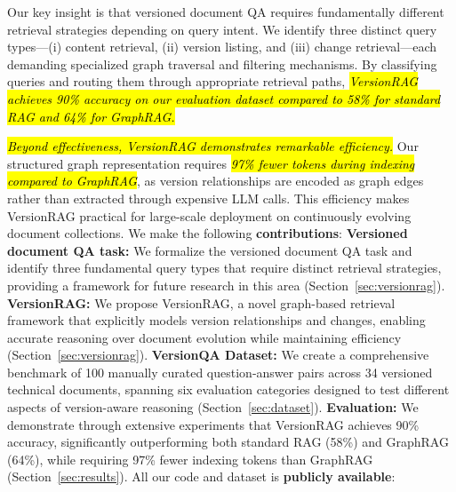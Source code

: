 Our key insight is that versioned document QA requires fundamentally different retrieval strategies depending on query intent. We identify three distinct query types—(i) content retrieval, (ii) version listing, and (iii) change retrieval—each demanding specialized graph traversal and filtering mechanisms. By classifying queries and routing them through appropriate retrieval paths, \hl{\textit{VersionRAG achieves 90\% accuracy on our evaluation dataset compared to 58\% for standard RAG and 64\% for GraphRAG.}}

\hl{\textit{Beyond effectiveness, VersionRAG demonstrates remarkable efficiency.}} Our structured graph representation requires \hl{\textit{97\% fewer tokens during indexing compared to GraphRAG}}, as version relationships are encoded as graph edges rather than extracted through expensive LLM calls. This efficiency makes VersionRAG practical for large-scale deployment on continuously evolving document collections.
We make the following \textbf{contributions}:
  \textbf{Versioned document QA task:} We formalize the versioned document QA task and identify three fundamental query types that require distinct retrieval strategies, providing a framework for future research in this area (Section~\ref{sec:versionrag}).
   \textbf{VersionRAG:} We propose VersionRAG, a novel graph-based retrieval framework that explicitly models version relationships and changes, enabling accurate reasoning over document evolution while maintaining efficiency (Section~\ref{sec:versionrag}).
  \textbf{VersionQA Dataset:} We create a comprehensive benchmark of 100 manually curated question-answer pairs across 34 versioned technical documents, spanning six evaluation categories designed to test different aspects of version-aware reasoning (Section~\ref{sec:dataset}).
  \textbf{Evaluation:} We demonstrate through extensive experiments that VersionRAG achieves 90\% accuracy, significantly outperforming both standard RAG (58\%) and GraphRAG (64\%), while requiring 97\% fewer indexing tokens than GraphRAG (Section~\ref{sec:results}).
All our code and dataset is \textbf{publicly available}: \githuburl


    
    
    
